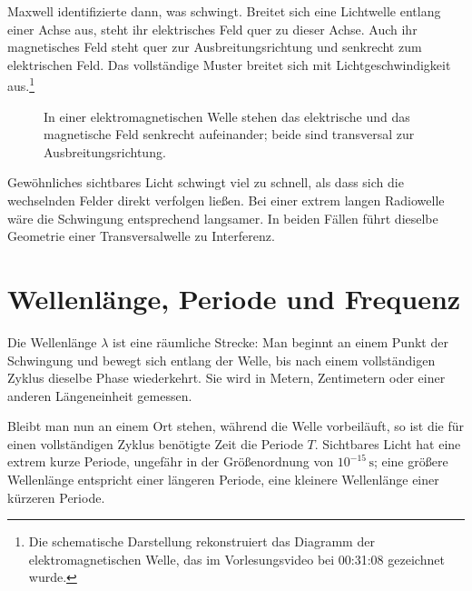 Maxwell identifizierte dann, was schwingt. Breitet sich eine Lichtwelle entlang einer Achse aus, steht ihr elektrisches Feld quer zu dieser Achse. Auch ihr magnetisches Feld steht quer zur Ausbreitungsrichtung und senkrecht zum elektrischen Feld. Das vollständige Muster breitet sich mit Lichtgeschwindigkeit aus.\footnote{Die schematische Darstellung rekonstruiert das Diagramm der elektromagnetischen Welle, das im Vorlesungsvideo bei 00:31:08 gezeichnet wurde.}

\begin{figure}[h]\centering
{}\caption{In einer elektromagnetischen Welle stehen das elektrische und das magnetische Feld senkrecht aufeinander; beide sind transversal zur Ausbreitungsrichtung.}\end{figure}

Gewöhnliches sichtbares Licht schwingt viel zu schnell, als dass sich die wechselnden Felder direkt verfolgen ließen. Bei einer extrem langen Radiowelle wäre die Schwingung entsprechend langsamer. In beiden Fällen führt dieselbe Geometrie einer Transversalwelle zu Interferenz.

\section{Wellenlänge, Periode und Frequenz}

Die Wellenlänge \(\lambda\) ist eine räumliche Strecke: Man beginnt an einem Punkt der Schwingung und bewegt sich entlang der Welle, bis nach einem vollständigen Zyklus dieselbe Phase wiederkehrt. Sie wird in Metern, Zentimetern oder einer anderen Längeneinheit gemessen.

Bleibt man nun an einem Ort stehen, während die Welle vorbeiläuft, so ist die für einen vollständigen Zyklus benötigte Zeit die Periode \(T\). Sichtbares Licht hat eine extrem kurze Periode, ungefähr in der Größenordnung von \(10^{-15}\,\mathrm{s}\); eine größere Wellenlänge entspricht einer längeren Periode, eine kleinere Wellenlänge einer kürzeren Periode.

